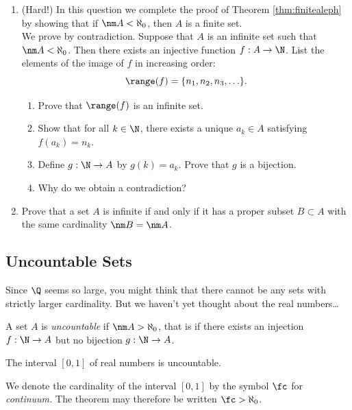 \begin{exercises}{}{}
\begin{enumerate}
	\item(Hard!) In this question we complete the proof of Theorem \ref{thm:finitealeph} by showing that if $\nm A<\aleph_0$, then $A$ is a finite set.\\[2pt]
	We prove by contradiction. Suppose that $A$ is an infinite set such that $\nm A<\aleph_0$. Then there exists an injective function $f:A\to\N$. List the elements of the image of $f$ in increasing order:
	  \[\range(f)=\{n_1,n_2,n_3,\ldots\}.\]
	\begin{enumerate}
	  \item Prove that $\range(f)$ is an infinite set.
	  \item Show that for all $k\in\N$, there exists a unique $a_k\in A$ satisfying $f(a_k)=n_k$.
	  \item Define $g:\N\to A$ by $g(k)=a_k$. Prove that $g$ is a bijection.
	  \item Why do we obtain a contradiction?
	\end{enumerate}
	
	\item\label{ex:cardinf} Prove that a set $A$ is infinite if and only if it has a proper subset $B\subset A$ with the same cardinality $\nm B=\nm A$.
\end{enumerate}

\end{exercises}

\clearpage



\subsection{Uncountable Sets}


Since $\Q$ seems so large, you might think that there cannot be any sets with strictly larger cardinality. But we haven't yet thought about the real numbers\ldots

\begin{defn}{}{}
	A set $A$ is \emph{uncountable} if $\nm A>\aleph_0$, that is if there exists an injection $f:\N\to A$ but no bijection $g:\N\to A$.
\end{defn}

\begin{thm}{}{}
	The interval $[0,1]$ of real numbers is uncountable.
\end{thm}

We denote the cardinality of the interval $[0,1]$ by the symbol $\fc$ for \emph{continuum.} The theorem may therefore be written $\fc>\aleph_0$.

